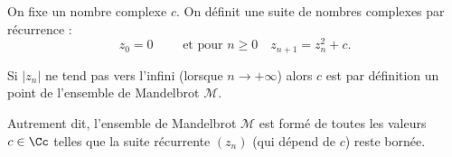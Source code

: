 \documentclass[11pt,class=report,crop=false]{standalone}
\begin{document}
\begin{cours}


On fixe un nombre complexe $c$. On définit une suite de nombres complexes par récurrence :
$$z_0 = 0 \qquad \text{ et pour } n\ge0 \quad z_{n+1} = z_n^2 + c.$$

Si $|z_n|$ ne tend pas vers l'infini (lorsque $n \to +\infty$) alors $c$ est  par définition un point de l'ensemble de Mandelbrot $\mathcal{M}$.

Autrement dit, l'ensemble de Mandelbrot $\mathcal{M}$ est formé de toutes les valeurs $c\in\Cc$ telles que la suite récurrente $(z_n)$ (qui dépend de $c$) reste bornée.
\end{cours}


\end{document}
